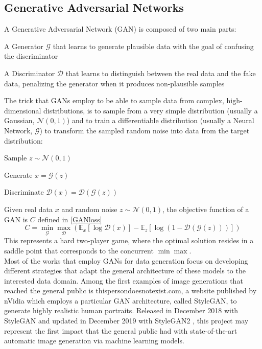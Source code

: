 \documentclass[conference]{IEEEtran}
\begin{document}
\subsection{Generative Adversarial Networks}
A Generative Adversarial Network (GAN) \cite{GANs} is composed of two main parts: \begin{list}{-}{}
	\item A Generator $\mathcal{G}$ that learns to generate plausible data with the goal of confusing the discriminator
	\item A Discriminator $\mathcal{D}$ that learns to distinguish between the real data and the fake data, penalizing the generator when it produces non-plausible samples
\end{list}
The trick that GANs employ to be able to sample data from complex, high-dimensional distributions, is to sample from a very simple distribution (usually a Gaussian, $\mathcal{N}(0, 1)$) and to train a differentiable distribution (usually a Neural Network, $\mathcal{G}$) to transform the sampled random noise into data from the target distribution: \begin{list}{-}{}
	\item Sample $z\sim\mathcal{N}(0,1)$
	\item Generate $x=\mathcal{G}(z)$
	\item Discriminate $\mathcal{D}(x) = \mathcal{D}(\mathcal{G}(z))$
\end{list}
Given real data $x$ and random noise $z\sim\mathcal{N}(0,1)$, the objective function of a GAN is $C$ defined in \eqref{GANloss}
\begin{equation}
C = \min_\mathcal{G}\max_\mathcal{D}\left( \mathbb{E}_x[\log\mathcal{D}(x)] -\mathbb{E}_z[\log (1-\mathcal{D}(\mathcal{G}(z)))] \right) \label{GANloss}
\end{equation}
This represents a hard two-player game, where the optimal solution resides in a saddle point that corresponds to the concurrent $\min\max$.\\
Most of the works that employ GANs for data generation focus on developing different strategies that adapt the general architecture of these models to the interested data domain. Among the first examples of image generations that reached the general public is thispersondoesnotexist.com, a website published by nVidia which employs a particular GAN architecture, called StyleGAN, to generate highly realistic human portraits. Released in December 2018 with StyleGAN \cite{stylegan} and updated in December 2019 with StyleGAN2 \cite{stylegan2}, this project may represent the first impact that the general public had with state-of-the-art automatic image generation via machine learning models.\\
\end{document}
